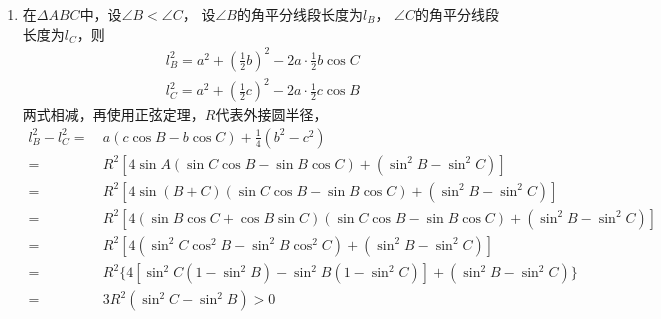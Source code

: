 \begin{enumerate}[label={\textbf{\arabic*.}},leftmargin=
    \inteval{\myenumleftmargin}pt]
\item 在$ \Delta ABC $中，设$ \angle B<\angle C $，
设$ \angle B $的角平分线段长度为$ l_B $，
$ \angle C $的角平分线段长度为$ l_C $，则
\begin{gather*}
    l_B^2=a^2+\left(\frac{1}{2}b\right)^2-2a\cdot \frac{1}{2}b
    \cos C \\
    l_C^2=a^2+\left(\frac{1}{2}c\right)^2-2a\cdot \frac{1}{2}c
    \cos B 
\end{gather*}
两式相减，再使用正弦定理，$ R $代表外接圆半径，
\begin{align*}
    l_B^2-l_C^2= &\ a(c\cos B-b\cos C) +\frac{1}{4}(b^2-c^2) \\
    =&\ R^2[4\sin A(\sin C\cos B-\sin B\cos C)+(\sin^2B-
    \sin^2C)] \\
    =&\ R^2[4\sin(B+C)(\sin C\cos B-\sin B\cos C)+(\sin^2B-
    \sin^2C)] \\
    =&\ R^2[4(\sin B\cos C+\cos B\sin C)(\sin C\cos B-
    \sin B\cos C)+(\sin^2B-\sin^2C)] \\
    =&\ R^2[4(\sin^2C\cos^2B-\sin^2B\cos^2C)+(\sin^2B-
    \sin^2C)] \\
    =&\ R^2\{4[\sin^2C(1-\sin^2B)-\sin^2B(1-\sin^2C)]+(\sin^2B-
    \sin^2C)\} \\
    =&\ 3R^2(\sin^2C-\sin^2B) >0
\end{align*}

\end{enumerate}
\myfootnote{\CopyrightStatementChap}
\cleardoublepage




